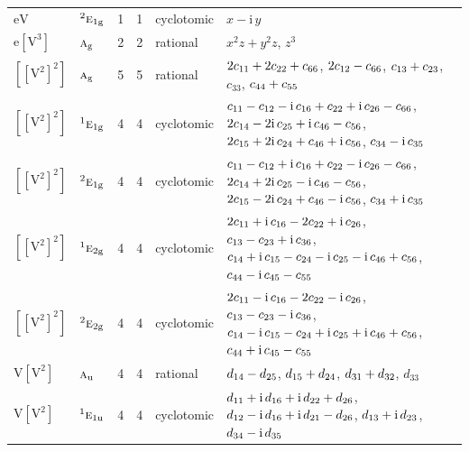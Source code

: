 \documentclass[10pt,a4paper]{article}
\numberwithin{equation}{section}
\newcommand{\irr}[1]{\text{\normalfont\scshape #1}}
\newcommand{\conjpair}[1]{{}^{#1}}
\newcommand{\ptag}[1]{\mathrm{#1}}
\newcommand{\iunit}{\mathrm{i}}
\newcommand{\jahn}[1]{\mathrm{#1}}
\newlength{\fillwidth}\newlength{\cellwidth}\newlength{\colwidth}
\newcommand{\signbreak}{\penalty100\relax}
\begin{document}
{\begin{longtable}{@{}llrrl>{\RaggedRight\arraybackslash}p{\fillwidth}@{}}
$\jahn{eV}$ & $\conjpair{2}\irr{e}_{1\ptag{g}}$ & 1 & 1 & cyclotomic & $x - \iunit{}\,y$\\
$\jahn{e[V^{3}]}$ & $\irr{a}_{\ptag{g}}$ & 2 & 2 & rational & $x^{2}z + y^{2}z$, $z^{3}$\\
$\jahn{[[V^{2}]^{2}]}$ & $\irr{a}_{\ptag{g}}$ & 5 & 5 & rational & $2c_{11} +\signbreak 2c_{22} +\signbreak c_{66}$, $2c_{12} -\signbreak c_{66}$, $c_{13} +\signbreak c_{23}$, $c_{33}$, $c_{44} +\signbreak c_{55}$\\
$\jahn{[[V^{2}]^{2}]}$ & $\conjpair{1}\irr{e}_{1\ptag{g}}$ & 4 & 4 & cyclotomic & $c_{11} -\signbreak c_{12} -\signbreak \iunit{}\,c_{16} +\signbreak c_{22} +\signbreak \iunit{}\,c_{26} -\signbreak c_{66}$, $2c_{14} -\signbreak 2\iunit{}\,c_{25} +\signbreak \iunit{}\,c_{46} -\signbreak c_{56}$, $2c_{15} +\signbreak 2\iunit{}\,c_{24} +\signbreak c_{46} +\signbreak \iunit{}\,c_{56}$, $c_{34} -\signbreak \iunit{}\,c_{35}$\\
$\jahn{[[V^{2}]^{2}]}$ & $\conjpair{2}\irr{e}_{1\ptag{g}}$ & 4 & 4 & cyclotomic & $c_{11} -\signbreak c_{12} +\signbreak \iunit{}\,c_{16} +\signbreak c_{22} -\signbreak \iunit{}\,c_{26} -\signbreak c_{66}$, $2c_{14} +\signbreak 2\iunit{}\,c_{25} -\signbreak \iunit{}\,c_{46} -\signbreak c_{56}$, $2c_{15} -\signbreak 2\iunit{}\,c_{24} +\signbreak c_{46} -\signbreak \iunit{}\,c_{56}$, $c_{34} +\signbreak \iunit{}\,c_{35}$\\
$\jahn{[[V^{2}]^{2}]}$ & $\conjpair{1}\irr{e}_{2\ptag{g}}$ & 4 & 4 & cyclotomic & $2c_{11} +\signbreak \iunit{}\,c_{16} -\signbreak 2c_{22} +\signbreak \iunit{}\,c_{26}$, $c_{13} -\signbreak c_{23} +\signbreak \iunit{}\,c_{36}$, $c_{14} +\signbreak \iunit{}\,c_{15} -\signbreak c_{24} -\signbreak \iunit{}\,c_{25} -\signbreak \iunit{}\,c_{46} +\signbreak c_{56}$, $c_{44} -\signbreak \iunit{}\,c_{45} -\signbreak c_{55}$\\
$\jahn{[[V^{2}]^{2}]}$ & $\conjpair{2}\irr{e}_{2\ptag{g}}$ & 4 & 4 & cyclotomic & $2c_{11} -\signbreak \iunit{}\,c_{16} -\signbreak 2c_{22} -\signbreak \iunit{}\,c_{26}$, $c_{13} -\signbreak c_{23} -\signbreak \iunit{}\,c_{36}$, $c_{14} -\signbreak \iunit{}\,c_{15} -\signbreak c_{24} +\signbreak \iunit{}\,c_{25} +\signbreak \iunit{}\,c_{46} +\signbreak c_{56}$, $c_{44} +\signbreak \iunit{}\,c_{45} -\signbreak c_{55}$\\
$\jahn{V[V^{2}]}$ & $\irr{a}_{\ptag{u}}$ & 4 & 4 & rational & $d_{14} -\signbreak d_{25}$, $d_{15} +\signbreak d_{24}$, $d_{31} +\signbreak d_{32}$, $d_{33}$\\
$\jahn{V[V^{2}]}$ & $\conjpair{1}\irr{e}_{1\ptag{u}}$ & 4 & 4 & cyclotomic & $d_{11} +\signbreak \iunit{}\,d_{16} +\signbreak \iunit{}\,d_{22} +\signbreak d_{26}$, $d_{12} -\signbreak \iunit{}\,d_{16} +\signbreak \iunit{}\,d_{21} -\signbreak d_{26}$, $d_{13} +\signbreak \iunit{}\,d_{23}$, $d_{34} -\signbreak \iunit{}\,d_{35}$\\

\end{longtable}}
\end{document}
